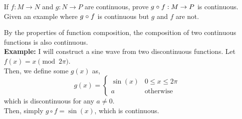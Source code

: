 \documentclass[11pt]{article}
\begin{document}
\pagebreak

\begin{homeworkProblem}
    If $f : M \rightarrow N$ and $g : N \rightarrow P$ are continuous, prove $g \hspace{0.05em} \circ \hspace{0.05em} f : M \rightarrow P$ is continuous. Given an
    example where $g \hspace{0.05em} \circ \hspace{0.05em} f$ is continuous but $g$ and $f$ are not. \\

    \solution

    By the properties of function composition, the composition of two continuous functions is also continuous. \\

    \textbf{Example:}
    I will construct a sine wave from two discontinuous functions. Let $f(x) = x \pmod{2\pi}$. \\

    Then, we define some $g(x)$ as,
    \[
        g(x) = \begin{cases}
            \sin(x) & 0 \leq x \leq 2\pi \\
            a       & \text{otherwise}
        \end{cases}
    \] which is discontinuous for any $a \neq 0$. \\

    Then, simply $g \circ f = \sin(x)$, which is continuous.
\end{homeworkProblem}

\pagebreak
\end{document}
